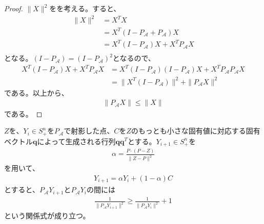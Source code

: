 \begin{proof}
  $\|X\|^2$をを考える。すると、
  \begin{align*}
    \|X\|^2 & = X^T X \\
            & = X^T \left(I - P_\mathcal{A} + P_\mathcal{A}\right) X \\
            & = X^T \left(I - P_\mathcal{A}\right) X + X^T P_\mathcal{A} X \\
  \end{align*}
  となる。$\left(I - P_\mathcal{A}\right) = \left(I - P_\mathcal{A}\right)^2$となるので、
  \begin{align*}
    X^T \left(I - P_\mathcal{A}\right) X + X^T P_\mathcal{A} X & = X^T \left(I - P_\mathcal{A}\right) \left(I - P_\mathcal{A}\right) X + X^T P_\mathcal{A} P_\mathcal{A} X\\
                                                               & = \|X^T \left(I - P_\mathcal{A}\right)\|^2 + \|P_\mathcal{A} X\|^2
  \end{align*}
  である。以上から、
  \begin{align*}
    \|P_\mathcal{A} X\| \leq \|X\|
  \end{align*}
  である。
\end{proof}
\begin{lemma} \label{Increment}
  $Z$を、$Y_i \in S_+^n$を$P_\mathcal{A}$で射影した点、$C$を$Z$のもっとも小さな固有値に対応する固有ベクトル$\mathbf{q}$によって生成される行列$\mathbf{q} \mathbf{q}^T$とする。$Y_{i + 1} \in S_+^n$を
  \begin{align*}
    \alpha = \frac{P \cdot (P - Z)}{\|Z - P\|^2}
  \end{align*}
  を用いて、
  \begin{align*}
    Y_{i + 1} = \alpha Y_i + (1 - \alpha) C
  \end{align*}
  とすると、$P_\mathcal{A} Y_{i + 1}$と$P_\mathcal{A} Y_i$の間には
  \begin{align*}
    \frac{1}{\|P_\mathcal{A} Y_{i + 1}\|^2} \geq \frac{1}{\|P_\mathcal{A} Y_i\|^2} + 1
  \end{align*}
  という関係式が成り立つ。
\end{lemma}
